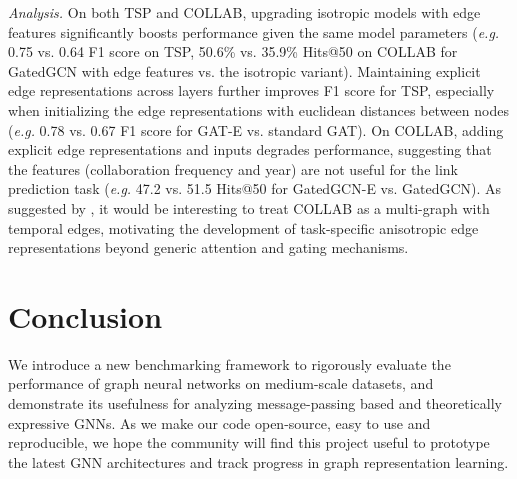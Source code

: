 \documentclass{article}
\begin{document}
\vspace{-0.1cm}
{\it Analysis.} On both TSP and COLLAB, upgrading isotropic models with edge features significantly boosts performance given the same model parameters (\textit{e.g.} 0.75 vs. 0.64 F1 score on TSP,  50.6\% vs. 35.9\% Hits@50 on COLLAB for GatedGCN with edge features vs. the isotropic variant). 
Maintaining explicit edge representations across layers further improves F1 score for TSP, especially when initializing the edge representations with euclidean distances between nodes (\textit{e.g.} 0.78 vs. 0.67 F1 score for GAT-E vs. standard GAT).
On COLLAB, adding explicit edge representations and inputs degrades performance, suggesting that the features (collaboration frequency and year) are not useful for the link prediction task (\textit{e.g.} 47.2 vs. 51.5 Hits@50 for GatedGCN-E vs. GatedGCN).
As suggested by \cite{hu2020ogb}, it would be interesting to treat COLLAB as a multi-graph with temporal edges, motivating the development of task-specific anisotropic edge representations beyond generic attention and gating mechanisms.



































\section{Conclusion}
We introduce a new benchmarking framework to rigorously evaluate the performance of graph neural networks on medium-scale datasets, and demonstrate its usefulness for analyzing message-passing based and theoretically expressive GNNs.
As we make our code open-source, easy to use and reproducible, we hope the community will find this project useful to prototype the latest GNN architectures and track progress in graph representation learning.
\end{document}
